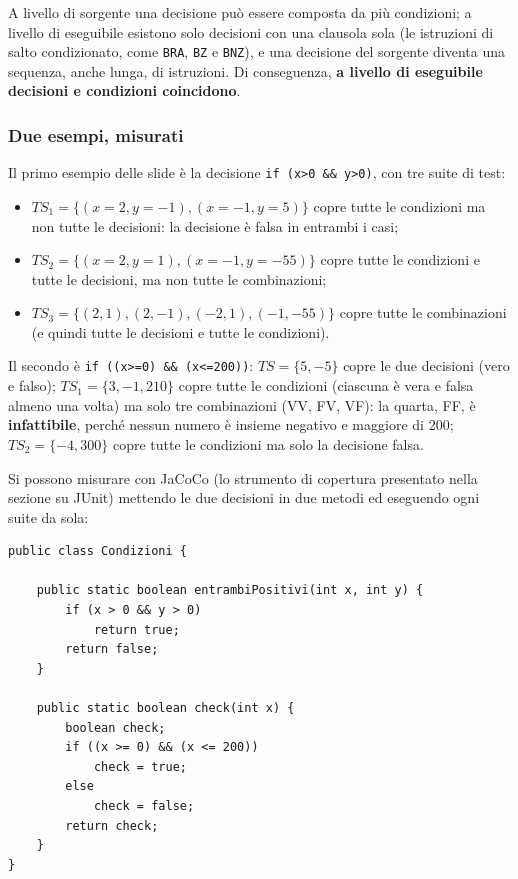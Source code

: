 A livello di sorgente una decisione può essere composta da più condizioni; a livello di eseguibile esistono solo
decisioni con una clausola sola (le istruzioni di salto condizionato, come \texttt{BRA}, \texttt{BZ} e \texttt{BNZ}), e
una decisione del sorgente diventa una sequenza, anche lunga, di istruzioni. Di conseguenza, \textbf{a livello di
eseguibile decisioni e condizioni coincidono}.

\subsubsection*{Due esempi, misurati}

Il primo esempio delle slide è la decisione \texttt{if (x>0 \&\& y>0)}, con tre suite di test:

\begin{itemize}
  \item \(TS_1 = \{(x{=}2, y{=}{-1}), (x{=}{-1}, y{=}5)\}\) copre tutte le condizioni ma non tutte le decisioni: la
        decisione è falsa in entrambi i casi;
  \item \(TS_2 = \{(x{=}2, y{=}1), (x{=}{-1}, y{=}{-55})\}\) copre tutte le condizioni e tutte le decisioni, ma non
        tutte le combinazioni;
  \item \(TS_3 = \{(2, 1), (2, {-1}), ({-2}, 1), ({-1}, {-55})\}\) copre tutte le combinazioni (e quindi tutte le
        decisioni e tutte le condizioni).
\end{itemize}

Il secondo è \texttt{if ((x>=0) \&\& (x<=200))}: \(TS = \{5, -5\}\) copre le due decisioni (vero e falso);
\(TS_1 = \{3, -1, 210\}\) copre tutte le condizioni (ciascuna è vera e falsa almeno una volta) ma solo tre combinazioni
(VV, FV, VF): la quarta, FF, è \textbf{infattibile}, perché nessun numero è insieme negativo e maggiore di 200;
\(TS_2 = \{-4, 300\}\) copre tutte le condizioni ma solo la decisione falsa.

Si possono misurare con JaCoCo (lo strumento di copertura presentato nella sezione su JUnit) mettendo le due decisioni
in due metodi ed eseguendo ogni suite da sola:

\begin{lstlisting}[style=java, name=Condizioni.java]
public class Condizioni {

    public static boolean entrambiPositivi(int x, int y) {
        if (x > 0 && y > 0)
            return true;
        return false;
    }

    public static boolean check(int x) {
        boolean check;
        if ((x >= 0) && (x <= 200))
            check = true;
        else
            check = false;
        return check;
    }
}
\end{lstlisting}

